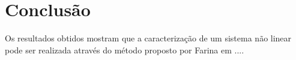 \chapter{Conclusão}

Os resultados obtidos mostram que a caracterização de um sistema não linear pode ser realizada através do método proposto por Farina em ....
